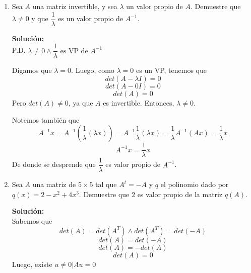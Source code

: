 \documentclass[12pt]{article}
\newenvironment{solucion}
{\begin{mdframed}[backgroundcolor=black!10]
		{\bf Solución:}\\
	}
	{
	\end{mdframed}
}
\newenvironment{preguntas}
{\begin{enumerate}\itemsep12pt
	}
	{
	\end{enumerate}
}
\newcommand{\ra}{\rightarrow}
\begin{document}
\begin{preguntas}
\begin{solucion}
		Para $\lambda = 2+i$,
		$$(A-(2+i)\lambda)x = 0 \ra 
		\begin{bmatrix} 
		-1-i & -2 \\ 
		1 & 1-i 
		\end{bmatrix} \sim 
		\begin{bmatrix} 
		-1-i & -2 \\ 
		0 & 0
		\end{bmatrix}$$
		$$(-1-i)x_1 - 2x_2 = 0 \ra \begin{array}{lcl}
		x_1 & = & x_1 \\
		x_2 & = & \dfrac{-1-i}{2}x_1
		\end{array}$$
		Luego,
		$$v_1 = \begin{pmatrix}
		2 \\
		-1-i
		\end{pmatrix}, \quad
		v_2 = \begin{pmatrix}
		2 \\
		-1+i
		\end{pmatrix} $$
		Por último, las bases de los espacios propios están formadas por los vectores propios asociados a cada valor propio, es decir
		$$E_{2+i} = Gen\left\{\begin{pmatrix}
		2 \\
		-1-i
		\end{pmatrix}\right\}, \quad 
		E_{2-i} = Gen\left\{\begin{pmatrix}
		2 \\
		-1+i
		\end{pmatrix}\right\}$$
\end{solucion}
\item Sea $A$ una matriz invertible, y sea $\lambda$ un valor propio de $A$. Demuestre que $\lambda \neq 0$ y que $\dfrac{1}{\lambda}$ es un valor propio de $A^{-1}$.
\begin{solucion}

		P.D. $\lambda \neq 0 \wedge \dfrac{1}{\lambda} \text{ es VP de }A^{-1}$
		
		Digamos que $\lambda = 0$. Luego, como $\lambda = 0$ es un VP, tenemos que
		$$det(A-\lambda I) = 0$$
		$$det(A-0 I) = 0$$
		$$det(A) = 0$$
		Pero $det(A) \neq 0$, ya que $A$ es invertible. Entonces, $\lambda \neq 0$.
		
		Notemos también que
		$$A^{-1}x 
		= A^{-1}\left(\dfrac{1}{\lambda}(\lambda x)\right)
		= A^{-1}\dfrac{1}{\lambda}(\lambda x)
		= \dfrac{1}{\lambda}A^{-1}(A x)
		= \dfrac{1}{\lambda} x$$
		$$A^{-1}x 
		= \dfrac{1}{\lambda} x$$
		De donde se desprende que $\dfrac{1}{\lambda}$ es valor propio de $A^{-1}$.
\end{solucion}
\item Sea $A$ una matriz de $5 \times 5$ tal que $A^t = -A$ y $q$ el polinomio dado por $q(x) = 2-x^2+4x^3$. Demuestre que $2$ es valor propio de la matriz $q(A)$.
\begin{solucion}
Sabemos que
		$$det(A) = det(A^T) \wedge det(A^T) = det(-A)$$
		$$det(A) = det(-A)$$
		$$det(A) = -det(A)$$
		$$det(A) = 0$$
		Luego, existe $u \neq 0 | Au = 0$
		

\end{solucion}
\end{preguntas}
\end{document}

